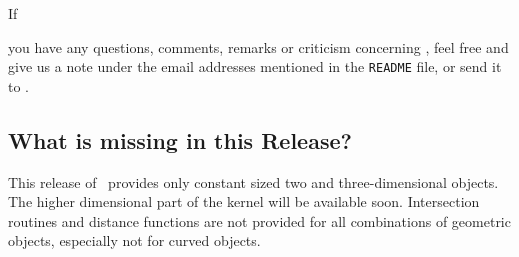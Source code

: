 If\begin{TexOnly}\end{TexOnly} you have any questions,
comments, remarks or criticism concerning \cgal, feel free and give us
a note under the email addresses mentioned in the {\tt README} file,
or send it to .

\subsection*{What is missing in this Release?}

This release of \cgal\ provides only constant sized two and
three-dimensional objects. The higher dimensional part of the kernel
will be available soon. Intersection routines and distance
functions are not provided for all combinations of geometric objects,
especially not for curved objects.

